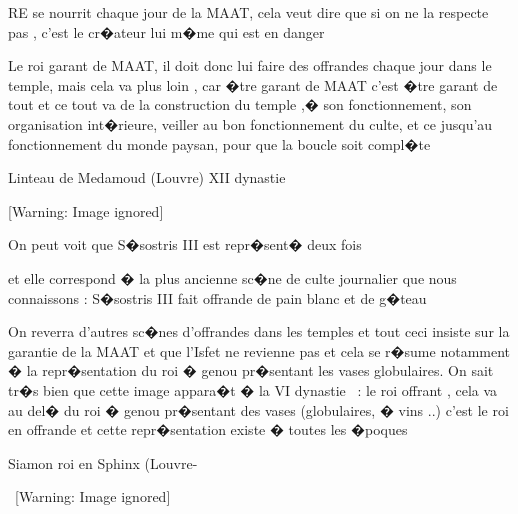 \documentclass{article}
\begin{document}
\bigskip

RE se nourrit chaque jour de la MAAT, cela veut dire que si on ne la respecte pas , c'est le cr�ateur lui m�me qui est en danger


\bigskip

Le roi garant de MAAT, il doit donc lui faire des offrandes chaque jour dans le temple, mais cela va plus loin , car �tre garant de MAAT c'est �tre garant de tout et ce tout va de la construction du temple ,� son fonctionnement, son organisation int�rieure, veiller au bon fonctionnement du culte, et ce jusqu'au fonctionnement du monde paysan, pour que la boucle soit compl�te


\bigskip


\bigskip

Linteau de Medamoud (Louvre) XII dynastie


\bigskip

  [Warning: Image ignored] %
 


\bigskip

On peut voit que S�sostris III est repr�sent� deux fois 

et elle correspond � la plus ancienne sc�ne de culte journalier que nous connaissons : S�sostris III fait offrande de pain blanc et de g�teau


\bigskip

On reverra d'autres sc�nes d'offrandes dans les temples et tout ceci insiste sur la garantie de la MAAT et que l'Isfet ne revienne pas et cela se r�sume notamment � la repr�sentation du roi � genou pr�sentant les vases globulaires. On sait tr�s bien que cette image appara�t � la VI dynastie \ : le roi offrant , cela va au del� du roi � genou pr�sentant des vases (globulaires, � vins ..) c'est le roi en offrande et cette repr�sentation existe � toutes les �poques


\bigskip


\bigskip


\bigskip

Siamon roi en Sphinx (Louvre-

\   [Warning: Image ignored] %
 


\bigskip


\bigskip
\end{document}
